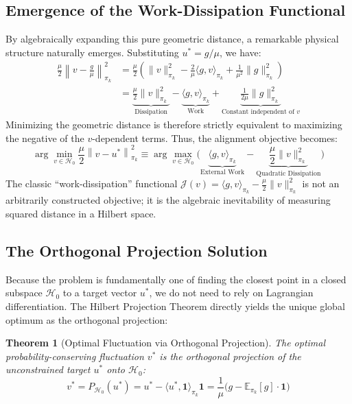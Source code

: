 \documentclass[11pt]{article}
\newtheorem{theorem}{Theorem}[section]
\theoremstyle{definition}
\theoremstyle{remark}
\newcommand{\E}{\mathbb{E}}
\newcommand{\pik}{\pi_k}
\begin{document}
\subsection{Emergence of the Work-Dissipation Functional}
\label{subsec:emergence}

By algebraically expanding this pure geometric distance, a remarkable physical structure naturally emerges. Substituting $u^* = g/\mu$, we have:
\begin{align}
    \frac{\mu}{2} \left\| v - \frac{g}{\mu} \right\|^2_{\pik} &= \frac{\mu}{2} \left( \|v\|^2_{\pik} - \frac{2}{\mu}\langle g, v \rangle_{\pik} + \frac{1}{\mu^2}\|g\|^2_{\pik} \right) \\
    &= \underbrace{\frac{\mu}{2} \|v\|^2_{\pik}}_{\text{Dissipation}} - \underbrace{\langle g, v \rangle_{\pik}}_{\text{Work}} + \underbrace{\frac{1}{2\mu} \|g\|^2_{\pik}}_{\text{Constant independent of } v}
\end{align}
Minimizing the geometric distance is therefore strictly equivalent to maximizing the negative of the $v$-dependent terms. Thus, the alignment objective becomes:
\begin{equation}
\label{eq:constrained_opt}
    \arg\min_{v \in \mathcal{H}_0} \frac{\mu}{2} \left\| v - u^* \right\|^2_{\pik} \equiv \arg\max_{v \in \mathcal{H}_0} \Big( \underbrace{\langle g, v \rangle_{\pik}}_{\text{External Work}} - \underbrace{\frac{\mu}{2} \|v\|^2_{\pik}}_{\text{Quadratic Dissipation}} \Big)
\end{equation}
The classic ``work-dissipation'' functional $\mathcal{J}(v) = \langle g, v \rangle_{\pik} - \frac{\mu}{2}\|v\|^2_{\pik}$ is not an arbitrarily constructed objective; it is the algebraic inevitability of measuring squared distance in a Hilbert space.

\subsection{The Orthogonal Projection Solution}
\label{subsec:projection}

Because the problem is fundamentally one of finding the closest point in a closed subspace $\mathcal{H}_0$ to a target vector $u^*$, we do not need to rely on Lagrangian differentiation. The Hilbert Projection Theorem directly yields the unique global optimum as the orthogonal projection:

\begin{theorem}[Optimal Fluctuation via Orthogonal Projection]
\label{thm:projection}
The optimal probability-conserving fluctuation $v^*$ is the orthogonal projection of the unconstrained target $u^*$ onto $\mathcal{H}_0$:
\begin{equation}
\label{eq:projection_solution}
    v^* = P_{\mathcal{H}_0}(u^*) = u^* - \langle u^*, \mathbf{1} \rangle_{\pik} \mathbf{1} = \frac{1}{\mu}\Big( g - \E_{\pik}[g] \cdot \mathbf{1} \Big)
\end{equation}
\end{theorem}
\end{document}
